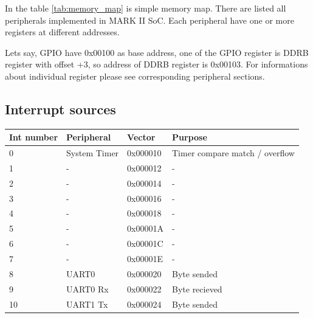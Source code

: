 In the table \ref{tab:memory_map} is simple memory map. There are listed all
peripherals implemented in MARK II SoC. Each peripheral have one or more registers at different
addresses.

Lets say, GPIO have 0x00100 as base address, one of the GPIO register
is DDRB register with offset +3, so address of DDRB register is 0x00103. For
informations about individual register please see corresponding peripheral sections.

\subsection{Interrupt sources}

\begin{table}[]
    \centering
    \begin{tabular}{|l|l|l|l|}
        \hline
        \textbf{Int number} & \textbf{Peripheral} & \textbf{Vector} & \textbf{Purpose}               \\ \hline
        0                   & System Timer        & 0x000010        & Timer compare match / overflow \\ \hline
        1                   & -                   & 0x000012        & -                              \\ \hline
        2                   & -                   & 0x000014        & -                              \\ \hline
        3                   & -                   & 0x000016        & -                              \\ \hline
        4                   & -                   & 0x000018        & -                              \\ \hline
        5                   & -                   & 0x00001A        & -                              \\ \hline
        6                   & -                   & 0x00001C        & -                              \\ \hline
        7                   & -                   & 0x00001E        & -                              \\ \hline
        8                   & UART0               & 0x000020        & Byte sended                    \\ \hline
        9                   & UART0 Rx            & 0x000022        & Byte recieved                  \\ \hline
        10                  & UART1 Tx            & 0x000024        & Byte sended                    \\ \hline

\end{tabular}
\end{table}
